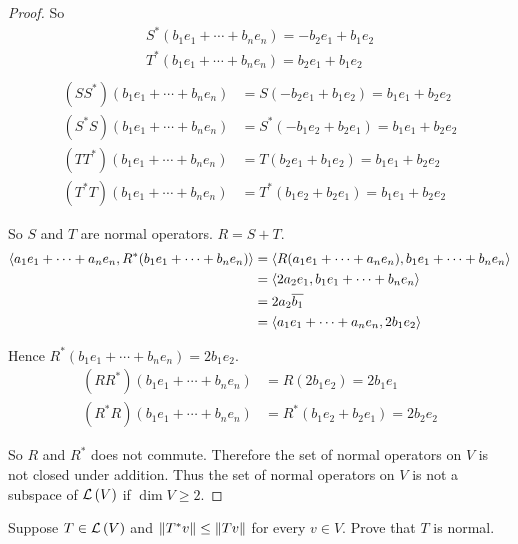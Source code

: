 \begin{proof}
    So
    \[
        \begin{split}
            S^{*}(b_{1}e_{1} + \cdots + b_{n}e_{n}) = -b_{2}e_{1} + b_{1}e_{2} \\
            T^{*}(b_{1}e_{1} + \cdots + b_{n}e_{n}) = b_{2}e_{1} + b_{1}e_{2} \\
        \end{split}
    \]
    \begin{align*}
        (SS^{*})(b_{1}e_{1} + \cdots + b_{n}e_{n}) & = S(-b_{2}e_{1} + b_{1}e_{2}) = b_{1}e_{1} + b_{2}e_{2} \\
        (S^{*}S)(b_{1}e_{1} + \cdots + b_{n}e_{n}) & = S^{*}(-b_{1}e_{2} + b_{2}e_{1}) = b_{1}e_{1} + b_{2}e_{2} \\
        (TT^{*})(b_{1}e_{1} + \cdots + b_{n}e_{n}) & = T(b_{2}e_{1} + b_{1}e_{2}) = b_{1}e_{1} + b_{2}e_{2} \\
        (T^{*}T)(b_{1}e_{1} + \cdots + b_{n}e_{n}) & = T^{*}(b_{1}e_{2} + b_{2}e_{1}) = b_{1}e_{1} + b_{2}e_{2}
    \end{align*}

    So $S$ and $T$ are normal operators. $R = S + T$.
    \begin{align*}
        \left\langle{a_{1}e_{1} + \cdots + a_{n}e_{n}, R^{*}(b_{1}e_{1} + \cdots + b_{n}e_{n})}\right\rangle & = \left\langle{R(a_{1}e_{1} + \cdots + a_{n}e_{n}), b_{1}e_{1} + \cdots + b_{n}e_{n}}\right\rangle \\
        & = \left\langle{2a_{2}e_{1}, b_{1}e_{1} + \cdots + b_{n}e_{n}}\right\rangle \\
        & = 2a_{2}\overline{b_{1}} \\
        & = \left\langle{a_{1}e_{1} + \cdots + a_{n}e_{n}, 2b_{1}e_{2}}\right\rangle
    \end{align*}

    Hence $R^{*}(b_{1}e_{1} + \cdots + b_{n}e_{n}) = 2b_{1}e_{2}$.
    \begin{align*}
        (RR^{*})(b_{1}e_{1} + \cdots + b_{n}e_{n}) & = R(2b_{1}e_{2}) = 2b_{1}e_{1} \\
        (R^{*}R)(b_{1}e_{1} + \cdots + b_{n}e_{n}) & = R^{*}(b_{1}e_{2} + b_{2}e_{1}) = 2b_{2}e_{2}
    \end{align*}

    So $R$ and $R^{*}$ does not commute. Therefore the set of normal operators on $V$ is not closed under addition. Thus the set of normal operators on $V$ is not a subspace of $\mathcal{L}\left({V}\right)$ if $\dim V\geq 2$.
\end{proof}
\newpage

\begin{exercise}
    Suppose $T\in\mathcal{L}\left({V}\right)$ and $\left\Vert{T^{*}v}\right\Vert \leq \left\Vert{Tv}\right\Vert$ for every $v\in V$. Prove that $T$ is normal.
\end{exercise}

